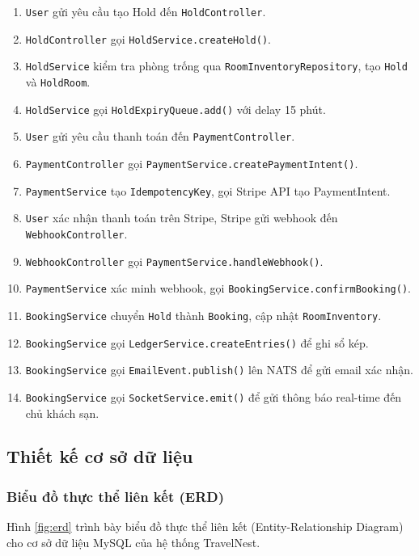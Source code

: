 \documentclass[13pt,a4paper,twoside]{report}
\begin{document}
\begin{enumerate}
  \item \texttt{User} gửi yêu cầu tạo Hold đến \texttt{HoldController}.
  \item \texttt{HoldController} gọi \texttt{HoldService.createHold()}.
  \item \texttt{HoldService} kiểm tra phòng trống qua \texttt{RoomInventoryRepository}, tạo \texttt{Hold} và \texttt{HoldRoom}.
  \item \texttt{HoldService} gọi \texttt{HoldExpiryQueue.add()} với delay 15 phút.
  \item \texttt{User} gửi yêu cầu thanh toán đến \texttt{PaymentController}.
  \item \texttt{PaymentController} gọi \texttt{PaymentService.createPaymentIntent()}.
  \item \texttt{PaymentService} tạo \texttt{IdempotencyKey}, gọi Stripe API tạo PaymentIntent.
  \item \texttt{User} xác nhận thanh toán trên Stripe, Stripe gửi webhook đến \texttt{WebhookController}.
  \item \texttt{WebhookController} gọi \texttt{PaymentService.handleWebhook()}.
  \item \texttt{PaymentService} xác minh webhook, gọi \texttt{BookingService.confirmBooking()}.
  \item \texttt{BookingService} chuyển \texttt{Hold} thành \texttt{Booking}, cập nhật \texttt{RoomInventory}.
  \item \texttt{BookingService} gọi \texttt{LedgerService.createEntries()} để ghi sổ kép.
  \item \texttt{BookingService} gọi \texttt{EmailEvent.publish()} lên NATS để gửi email xác nhận.
  \item \texttt{BookingService} gọi \texttt{SocketService.emit()} để gửi thông báo real-time đến chủ khách sạn.
\end{enumerate}

\subsection{Thiết kế cơ sở dữ liệu}

\subsubsection{Biểu đồ thực thể liên kết (ERD)}

Hình \ref{fig:erd} trình bày biểu đồ thực thể liên kết (Entity-Relationship Diagram) cho cơ sở dữ liệu MySQL của hệ thống TravelNest.
\end{document}
